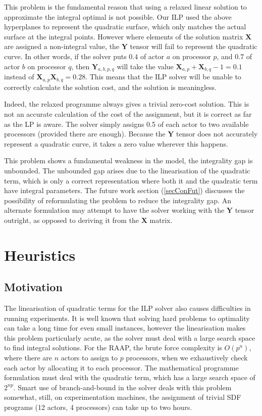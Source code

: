 This problem is the fundamental reason that using a relaxed linear solution to approximate the integral optimal is not possible.
Our ILP used the above hyperplanes to represent the quadratic surface, which only matches the actual surface at the integral points.
However where elements of the solution matrix $\mathbf{X}$ are assigned a non-integral value, the $\mathbf{Y}$ tensor will fail to represent the quadratic curve.
In other words, if the solver puts $0.4$ of actor $a$ on processor $p$, and $0.7$ of actor $b$ on processor $q$, then $\mathbf{Y}_{a,b,p,q}$ will take the value $\mathbf{X}_{a,p} + \mathbf{X}_{b,q} - 1 = 0.1$ instead of $\mathbf{X}_{a,p} \mathbf{X}_{b,q} = 0.28$.
This means that the ILP solver will be unable to correctly calculate the solution cost, and the solution is meaningless.

Indeed, the relaxed programme always gives a trivial zero-cost solution.
This is not an accurate calculation of the cost of the assignment, but it is correct as far as the LP is aware.
The solver simply assigns 0.5 of each actor to two available processors (provided there are enough).
Because the $\mathbf{Y}$ tensor does not accurately represent a quadratic curve, it takes a zero value wherever this happens.

This problem shows a fundamental weakness in the model, the integrality gap is unbounded.
The unbounded gap arises due to the linearisation of the quadratic term, which is only a correct representation where both it and the quadratic term have integral parameters.
The future work section (\ref{secConFut}) discusses the possibility of reformulating the problem to reduce the integrality gap.
An alternate formulation may attempt to have the solver working with the $\mathbf{Y}$ tensor outright, as opposed to deriving it from the $\mathbf{X}$ matrix.

\section{Heuristics}

\subsection{Motivation}

The linearisation of quadratic terms for the ILP solver also causes difficulties in running experiments.
It is well known that solving hard problems to optimality can take a long time for even small instances, however the linearisation makes this problem particularly acute, as the solver must deal with a large search space to find integral solutions.
For the RAAP, the brute force complexity is $O(p^n)$, where there are $n$ actors to assign to $p$ processors, when we exhaustively check each actor by allocating it to each processor.
The mathematical programme formulation must deal with the quadratic term, which has a large search space of $2^{np}$.
Smart use of branch-and-bound in the solver deals with this problem somewhat, still, on experimentation machines, the assignment of trivial SDF programs (12 actors, 4 processors) can take up to two hours.


